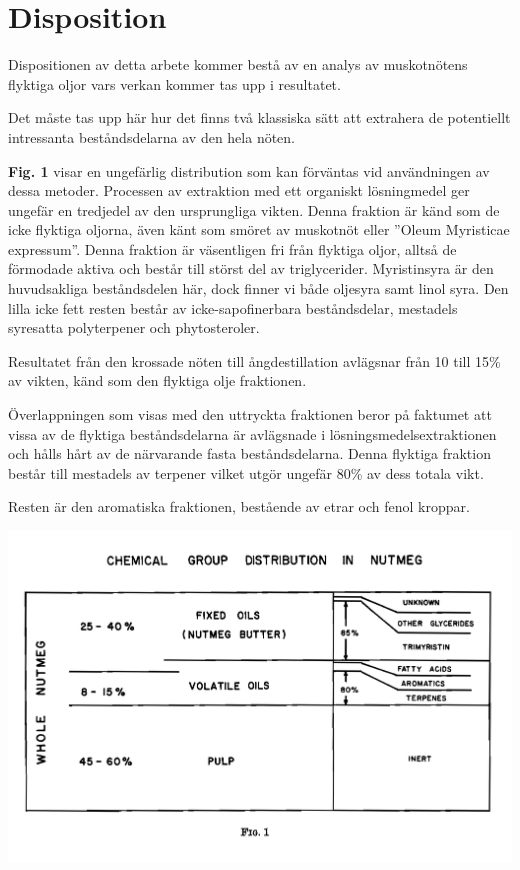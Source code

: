 \documentclass[a4paper,margin=3.25cm]{article}
\begin{document}
\pagebreak

\section{Disposition}

Dispositionen av detta arbete kommer bestå av en analys av muskotnötens flyktiga oljor
vars verkan kommer tas upp i resultatet.

Det måste tas upp här hur det finns två klassiska sätt att extrahera de potentiellt intressanta beståndsdelarna av den hela nöten.

\textbf{Fig. 1} \cite{shulgin1967chemistry} visar en ungefärlig distribution som kan förväntas vid användningen av dessa metoder. Processen av extraktion med ett organiskt lösningmedel ger ungefär en tredjedel av den ursprungliga vikten. Denna fraktion är känd som de icke flyktiga oljorna, även känt som smöret av muskotnöt eller ''Oleum Myristicae expressum''. Denna fraktion är väsentligen fri från flyktiga oljor, alltså de förmodade aktiva och består till störst del av triglycerider. Myristinsyra är den huvudsakliga beståndsdelen här, dock finner vi både oljesyra samt linol syra. Den lilla icke fett resten består av icke-sapofinerbara beståndsdelar, mestadels syresatta polyterpener och phytosteroler. \cite{shulgin1967chemistry}

Resultatet från den krossade nöten till ångdestillation avlägsnar från 10 till 15\% av vikten, känd som den flyktiga olje fraktionen.

Överlappningen som visas med den uttryckta fraktionen beror på faktumet att vissa av de flyktiga beståndsdelarna är avlägsnade i lösningsmedelsextraktionen och hålls hårt av de närvarande fasta beståndsdelarna.
Denna flyktiga fraktion består till mestadels av terpener vilket utgör ungefär 80\% av dess totala vikt.

Resten är den aromatiska fraktionen, bestående av etrar och fenol kroppar.\cite{shulgin1967chemistry}


\includegraphics[scale=0.103]{Figure1}
\end{document}

